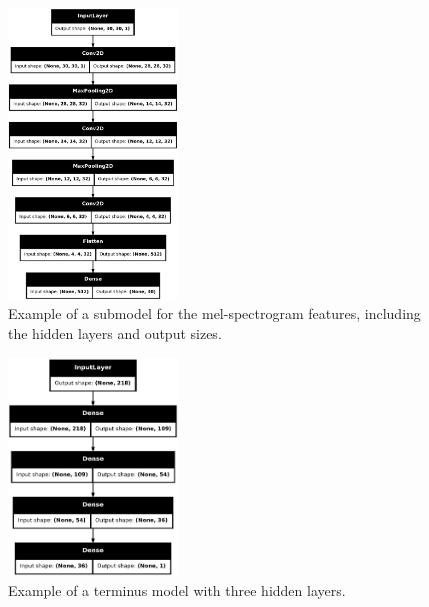 \documentclass{article}
\begin{document}
			\begin{figure}[htbp]
				\begin{center}
					\includegraphics[width=0.4\textwidth]{images/mel_model_plot.png}
					\caption{Example of a submodel for the mel-spectrogram features, including the
					hidden layers and output sizes.}
					\label{fig:mel_model_plot}
				\end{center}
			\end{figure}
			\begin{figure}[htbp]
				\begin{center}
					\includegraphics[width=0.4\textwidth]{images/term_model_plot.png}
					\caption{Example of a terminus model with three hidden layers.}
					\label{fig:term_model_plot}
				\end{center}
			\end{figure}
\end{document}
